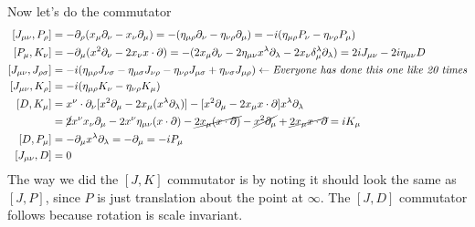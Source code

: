 \documentclass[11pt]{article}
\begin{document}
\begin{enumerate}
	Now let's do the commutator 
	\[
	\begin{aligned}
		\, [J_{\mu \nu}, P_\rho] &= - \partial_\rho (x_{\mu} \partial_\nu - x_\nu \partial_\mu) = - (\eta_{\mu \rho} \partial_\nu - \eta_{\nu \rho} \partial_\mu) = - i (\eta_{\mu \rho} P_\nu - \eta_{\nu \rho} P_\mu)\\
		[P_\mu, K_\nu] &= - \partial_{\mu} (x^2 \partial_\nu - 2 x_\nu x \cdot \partial) = - (2 x_\mu \partial_\nu - 2 \eta_{\mu \nu} x^\lambda \partial_\lambda - 2 x_\nu \delta_\mu^\lambda \partial_\lambda) = 2 i J_{\mu \nu} - 2 i \eta_{\mu \nu} D\\
		[J_{\mu \nu}, J_{\rho \sigma}] &= -i (\eta_{\mu \rho} J_{\nu \sigma} - \eta_{\mu \sigma} J_{\nu \rho} - \eta_{\nu \rho} J_{\mu \sigma} + \eta_{\nu \sigma} J_{\mu \rho}) \leftarrow\textit{Everyone has done this one like 20 times}\\
		[J_{\mu \nu}, K_\rho] &= -i (\eta_{\mu \rho} K_\nu - \eta_{\nu \rho} K_\mu ) \\
		[D, K_\mu] &= x^\nu \cdot \partial_\nu [x^2 \partial_\mu - 2 x_\mu (x^\lambda \partial_\lambda)] - [x^2 \partial_\mu - 2x_\mu x \cdot \partial] x^\lambda \partial_\lambda \\
		&= \cancel{2} x^\nu x_\nu \partial_\mu - 2 x^\nu \eta_{\mu \nu} (x \cdot \partial) - \cancel{2 x_\mu (x \cdot \partial)} - \cancel{x^2 \partial_\mu} + \cancel{2 x_\mu x \cdot \partial} =  i K_\mu\\
		[D, P_\mu] &= - \partial_\mu x^\lambda \partial_\lambda = - \partial_\mu = - i P_\mu\\
		[J_{\mu \nu}, D] &= 0
	\end{aligned}
	\]
	The way we did the $[J, K]$ commutator is by noting it should look the same as $[J, P]$, since $P$ is just translation about the point at $\infty$. The $[J,D]$ commutator follows because rotation is scale invariant.
	

\end{enumerate}
\end{document}
